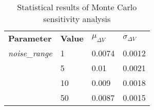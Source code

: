 
                    \begin{table}[]
                    \centering
                    \begin{tabular}{l l l l}
                    \rowcolor[HTML]{EFEFEF} \textbf{Parameter} & \textbf{Value} & \textbf{$\mu_{\Delta V}$} & \textbf{$\sigma_{\Delta V}$} \\
                    \textit{noise\_range} & 1 & 0.0074 & 0.0012 \\
 & 5 & 0.01 & 0.0021 \\
 & 10 & 0.009 & 0.0018 \\
 & 50 & 0.0087 & 0.0015 \\

                    \end{tabular}
                    \caption{Statistical results of Monte Carlo sensitivity analysis}
                    \label{tab:SensitivityAnalysis}
                    \end{table}
                    